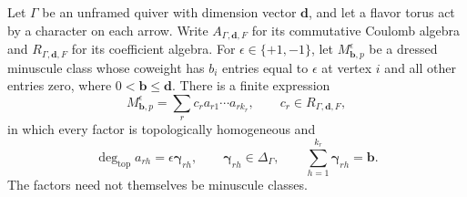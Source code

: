 \begin{lemma}\label{lem:root-charge-generation}
Let \(\Gamma\) be an unframed quiver with dimension vector \(\mathbf d\),
and let a flavor torus act by a character on each arrow.
Write \(A_{\Gamma,\mathbf d,F}\) for its commutative Coulomb algebra and
\(R_{\Gamma,\mathbf d,F}\) for its coefficient algebra.
For \(\epsilon\in\{+1,-1\}\), let
\(M_{\mathbf b,p}^{\epsilon}\) be a dressed minuscule class whose
coweight has \(b_i\) entries equal to \(\epsilon\) at vertex \(i\) and
all other entries zero, where \(0<\mathbf b\leq\mathbf d\).
There is a finite expression
\begin{equation}\label{eq:root-charge-words}
 M_{\mathbf b,p}^{\epsilon}
   =\sum_r c_r a_{r1}\cdots a_{rk_r},
 \qquad c_r\in R_{\Gamma,\mathbf d,F},
\end{equation}
in which every factor is topologically homogeneous and
\[
 \deg_{\mathrm{top}}a_{rh}=\epsilon\boldsymbol\gamma_{rh},
 \qquad
 \boldsymbol\gamma_{rh}\in\Delta_\Gamma,
 \qquad
 \sum_{h=1}^{k_r}\boldsymbol\gamma_{rh}=\mathbf b.
\]
The factors need not themselves be minuscule classes.
\end{lemma}

